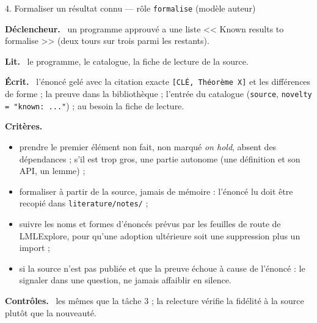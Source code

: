 \documentclass[11pt,a4paper]{article}
\newcommand{\cmd}[1]{\texttt{#1}}
\newcommand{\lmlx}{\textsf{LMLExplore}}
\newcommand{\rub}[1]{\par\smallskip\textsf{\textbf{#1.}}~}
\begin{document}
\begin{tache}{4. Formaliser un résultat connu --- rôle \cmd{formalise} (modèle auteur)}
\rub{Déclencheur} un programme approuvé a une liste << Known results to formalise >> (deux tours sur
trois parmi les restants).
\rub{Lit} le programme, le catalogue, la fiche de lecture de la source.
\rub{Écrit} l'énoncé gelé avec la citation exacte \cmd{[CLÉ, Théorème X]} et les différences de forme ;
la preuve dans la bibliothèque ; l'entrée du catalogue (\cmd{source}, \cmd{novelty = "known: ..."}) ;
au besoin la fiche de lecture.
\rub{Critères}
\begin{itemize}
\item prendre le premier élément non fait, non marqué \emph{on hold}, absent des dépendances ;
  s'il est trop gros, une partie autonome (une définition et son API, un lemme) ;
\item formaliser à partir de la source, jamais de mémoire : l'énoncé lu doit être recopié dans
  \cmd{literature/notes/} ;
\item suivre les noms et formes d'énoncés prévus par les feuilles de route de \lmlx{}, pour qu'une
  adoption ultérieure soit une suppression plus un import ;
\item si la source n'est pas publiée et que la preuve échoue à cause de l'énoncé : le signaler dans une
  question, ne jamais affaiblir en silence.
\end{itemize}
\rub{Contrôles} les mêmes que la tâche 3 ; la relecture vérifie la fidélité à la source plutôt que la
nouveauté.
\end{tache}
\end{document}
